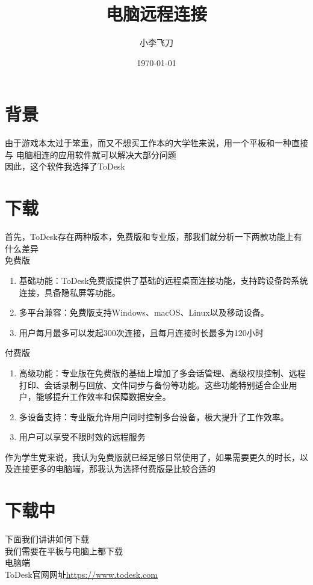 \documentclass{article}
\title{电脑远程连接}
\author{小李飞刀}
\date{\today}
\begin{document}
\maketitle

\section{背景}
由于游戏本太过于笨重，而又不想买工作本的大学牲来说，用一个平板和一种直接与
电脑相连的应用软件就可以解决大部分问题
\\ \indent 因此，这个软件我选择了ToDesk
\section{下载}
首先，ToDesk存在两种版本，免费版和专业版，那我们就分析一下两款功能上有什么差异
\\  免费版
\begin{enumerate}[(1)]
    \item 基础功能‌：ToDesk免费版提供了基础的远程桌面连接功能，支持跨设备跨系统连接，具备隐私屏等功能。‌
    \item 多平台兼容‌：免费版支持Windows、macOS、Linux以及移动设备。‌
    \item 用户每月最多可以发起300次连接，且每月连接时长最多为120小时
\end{enumerate}
 付费版
\begin{enumerate}[(1)]
    \item 高级功能‌：专业版在免费版的基础上增加了多会话管理、高级权限控制、远程打印、会话录制与回放、文件同步与备份等功能。这些功能特别适合企业用户，能够提升工作效率和保障数据安全。
    \item 多设备支持‌：专业版允许用户同时控制多台设备，极大提升了工作效率。
    \item 用户可以享受不限时效的远程服务‌
\end{enumerate}
作为学生党来说，我认为免费版就已经足够日常使用了，如果需要更久的时长，以及连接更多的电脑端，那我认为选择付费版是比较合适的
\section{下载中}
下面我们讲讲如何下载
\\ \indent 我们需要在平板与电脑上都下载
\\ \indent 电脑端
\\ \indent ToDesk官网网址\href{https://www.todesk.com}{https://www.todesk.com}
\end{document}

